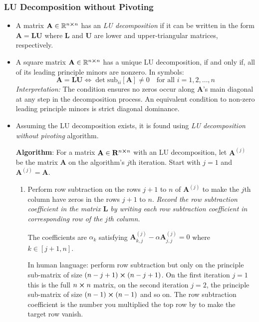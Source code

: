 \documentclass[11pt, a4paper]{article}
\newcommand{\R}{\mathbb{R}} %
\newcommand{\mat}[1]{\mathbf{#1}} %
\begin{document}
\subsubsection{LU Decomposition without Pivoting}
\begin{itemize}
	\item A matrix $ \mat{A} \in \R^{n \cross n}$ has an \textit{LU decomposition} if it can be written in the form $ \mat{A} = \mat{L} \mat{U} $ where $ \mat{L} $ and $ \mat{U} $ are lower and upper-triangular matrices, respectively.
	
	\item A square matrix $ \mat{A} \in \R^{n \cross n} $ has a unique LU decomposition, if and only if, all of its leading principle minors are nonzero. In symbols:
	\begin{equation*}
		\mat{A} = \mat{L}\mat{U} \iff \det \text{sub}_{ i i}[\mat{A}] \neq 0 \quad \text{for all } i = 1, 2, \dots, n
	\end{equation*}
	\textit{Interpretation:} The condition ensures no zeros occur along $ \mat{A} $'s main diagonal at any step in the decomposition process. An equivalent condition to non-zero leading principle minors is strict diagonal dominance.
	
	\item Assuming the LU decomposition exists, it is found using \textit{LU decomposition without pivoting} algorithm. 
	
	\textbf{Algorithm}: For a matrix $ \mat{A} \in \mat{R}^{n \cross n} $ with an LU decomposition, let $ \mat{A}^{(j)} $ be the matrix $ \mat{A} $ on the algorithm's $ j $th iteration. Start with $ j = 1 $ and $ \mat{A}^{(j)} = \mat{A} $.
	\begin{enumerate}
		
		\item Perform row subtraction on the rows $ j + 1 $ to $ n $ of $ \mat{A}^{(j)} $ to make the $ j $th column have zeros in the rows $ j+1 $ to $ n $. \textit{Record the row subtraction coefficient in the matrix $ \mat{L} $ by writing each row subtraction coefficient in corresponding row of the $ j $th column.}
		
		The coefficients are $ \alpha_{k} $ satisfying $ \mat{A}^{(j)}_{k, j} - \alpha \mat{A}^{(j)}_{j, j}= 0 $ where $ k \in [j+1, n] $.
		
		In human language: perform row subtraction but only on the principle sub-matrix of size $ (n - j + 1) \cross (n - j + 1) $. On the first iteration $ j = 1 $ this is the full $ n \cross n $ matrix, on the second iteration $ j = 2 $, the principle sub-matrix of size $ (n-1) \cross (n-1) $ and so on. The row subtraction coefficient is the number you multiplied the top row by to make the target row vanish. 
		

\end{enumerate}
\end{itemize}
\end{document}
